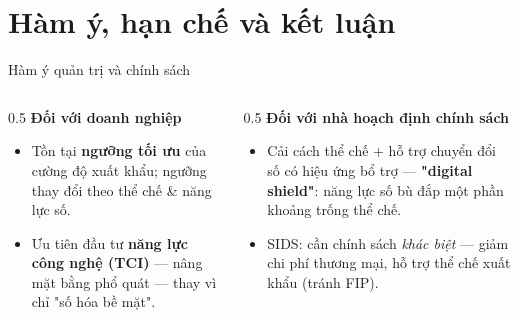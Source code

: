 \documentclass[aspectratio=169,11pt]{beamer}
\newcommand{\hl}[1]{\textcolor{accent2}{\textbf{#1}}}
\newcommand{\kw}[1]{\textcolor{accent}{\textbf{#1}}}
\begin{document}
\section{Hàm ý, hạn chế và kết luận}
\begin{frame}{Hàm ý quản trị và chính sách}
  \begin{columns}[T]
    \begin{column}{0.5\textwidth}
      \textbf{Đối với doanh nghiệp}
      \begin{itemize}\small
        \item Tồn tại \hl{ngưỡng tối ưu} của cường độ xuất khẩu; ngưỡng thay đổi theo thể chế \& năng lực số.
        \item Ưu tiên đầu tư \kw{năng lực công nghệ (TCI)} --- nâng mặt bằng phổ quát --- thay vì chỉ "số hóa bề mặt".
      \end{itemize}
    \end{column}
    \begin{column}{0.5\textwidth}
      \textbf{Đối với nhà hoạch định chính sách}
      \begin{itemize}\small
        \item Cải cách thể chế + hỗ trợ chuyển đổi số có hiệu ứng bổ trợ --- \kw{"digital shield"}: năng lực số bù đắp một phần khoảng trống thể chế.
        \item SIDS: cần chính sách \emph{khác biệt} --- giảm chi phí thương mại, hỗ trợ thể chế xuất khẩu (tránh FIP).
      \end{itemize}
    \end{column}
  \end{columns}
\end{frame}
\end{document}

